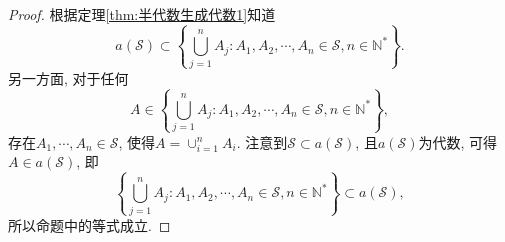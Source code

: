 \begin{proof}
	根据定理\ref{thm:半代数生成代数1}知道
	\begin{equation}
		a(\mathscr{S}) \subset \left\{ \bigcup_{j=1}^nA_j: A_1,A_2,\cdots,A_n\in\mathscr{S},
		n\in\mathbb{N}^*  \right\}.
	\end{equation}
	另一方面, 对于任何\begin{equation}
		A\in\left\{ \bigcup_{j=1}^nA_j: A_1,A_2,\cdots,A_n\in\mathscr{S},
		n\in\mathbb{N}^*  \right\},
	\end{equation}
	存在$A_1,\cdots,A_n\in\mathscr{S}$, 使得$A = \cup_{i=1}^nA_i$. 注意到$\mathscr{S}\subset a(\mathscr{S})$, 且$a(\mathscr{S})$为代数, 可得
	$A\in a(\mathscr{S})$, 即
	\begin{equation}
		\left\{ \bigcup_{j=1}^nA_j: A_1,A_2,\cdots,A_n\in\mathscr{S},
		n\in\mathbb{N}^*  \right\} \subset a(\mathscr{S}),
	\end{equation}
	所以命题中的等式成立.
\end{proof}


